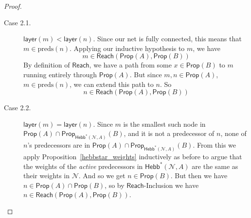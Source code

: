 \documentclass[letterpaper]{article}
\theoremstyle{definition}
\newcommand{\preds}[1]{\mbox{preds}(#1)}
\newcommand{\layer}[1]{\mathsf{layer}(#1)}
\newcommand{\Net}{\mathcal{N}}
\newcommand{\Prop}{\textsf{Prop}}
\newcommand{\Reach}{\textsf{Reach}}
\newcommand{\Hebbstar}[2]{\textsf{Hebb}^*(#1, #2)}
\begin{document}
\begin{proof}
\begin{enumerate}
\begin{description}
\begin{description}
                \begin{description}
                    \item[Case 2.1.] $\layer{m} < \layer{n}$.  Since our net is fully connected, this means that $m \in \preds{n}$.  Applying our inductive hypothesis to $m$, we have
                    \[
                        m \in \Reach(\Prop(A), \Prop(B))
                    \]
                    By definition of $\Reach$, we have a path from some $x \in \Prop(B)$ to $m$ running entirely through $\Prop(A)$.  But since $m, n \in \Prop(A)$, $m \in \preds{n}$, we can extend this path to $n$.  So
                    \[
                        n \in \Reach(\Prop(A), \Prop(B))
                    \]
                    
                    \item[Case 2.2.] $\layer{m} = \layer{n}$.
                    Since $m$ is the smallest such node in $\Prop(A) \cap \Prop_{\Hebbstar{\Net}{A}}(B)$, and it is not a predecessor of $n$, none of $n$'s predecessors are in $\Prop(A) \cap \Prop_{\Hebbstar{\Net}{A}}(B)$.  From this we apply Proposition~\ref{hebbstar_weights} inductively as before to argue that the weights of the \emph{active} predecessors in $\Hebbstar{\Net}{A}$ are the same as their weights in $\Net$.  And so we get $n \in \Prop(B)$.  But then we have $n \in \Prop(A) \cap \Prop(B)$, so by $\Reach$-Inclusion we have $n \in \Reach(\Prop(A), \Prop(B))$.
                \end{description}
            \end{description}
        \end{description}
        
    \end{enumerate}
\end{proof}
\end{document}
